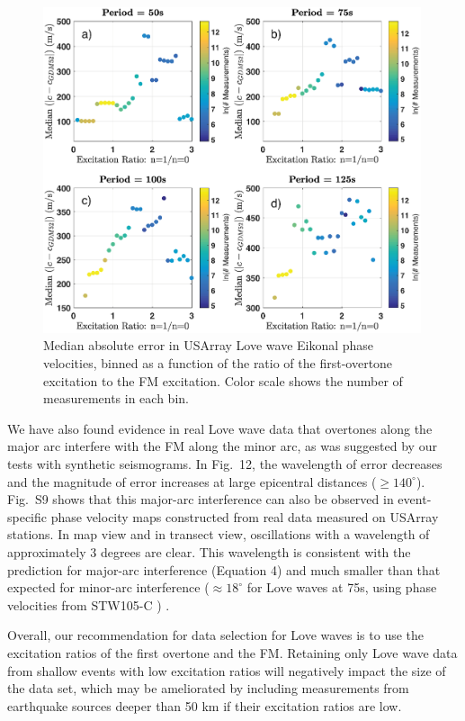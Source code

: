 \documentclass[extra,mreferee]{gji}
\begin{document}
\begin{figure}
 \includegraphics[width=0.99\textwidth]{Fig13.eps}
 \caption{Median absolute error in USArray Love wave Eikonal phase velocities, binned as a function of the ratio of the first-overtone excitation to the FM excitation. Color scale shows the number of measurements in each bin. }
\end{figure}
     
We have also found evidence in real Love wave data that overtones along the major arc interfere with the FM along the minor arc, as was suggested by our tests with synthetic seismograms. In Fig.\ 12, the wavelength of error decreases and the magnitude of error increases at large epicentral distances ($ \geq 140^\circ$). Fig.\ S9 shows that this major-arc interference can also be observed in event-specific phase velocity maps constructed from real data measured on USArray stations. In map view and in transect view, oscillations with a wavelength of approximately 3 degrees are clear. This wavelength is consistent with the prediction for major-arc interference (Equation 4) and much smaller than that expected for minor-arc interference ($\approx 18 ^\circ$ for Love waves at 75s, using phase velocities from STW105-C ) .     

Overall, our recommendation for data selection for Love waves is to use the excitation ratios of the first overtone and the FM. Retaining only Love wave data from shallow events with low excitation ratios will negatively impact the size of the data set, which may be ameliorated by including measurements from earthquake sources deeper than 50 km if their excitation ratios are low.
\end{document}
